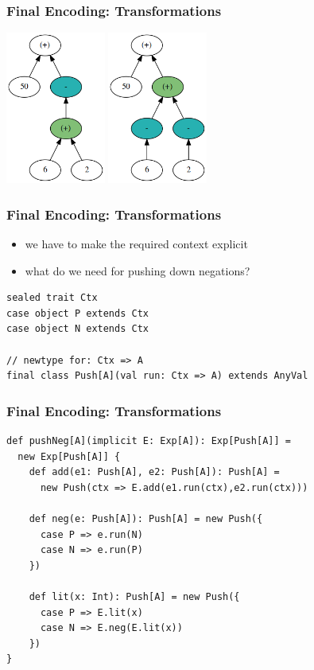 \documentclass{beamer}
\begin{document}
\begin{frame}
  \frametitle{Final Encoding: Transformations}
  \begin{center}
    \includegraphics[height=5cm]{../graphs/ast-from.png}
    \hfill
    \includegraphics[height=5cm]{../graphs/ast-to.png}
  \end{center}
\end{frame}

\begin{frame}
  \frametitle{Final Encoding: Transformations}
  \begin{itemize}
  \item we have to make the required context explicit
  \item what do we need for pushing down negations?
  \end{itemize}
\begin{verbatim}
sealed trait Ctx
case object P extends Ctx
case object N extends Ctx

// newtype for: Ctx => A
final class Push[A](val run: Ctx => A) extends AnyVal
\end{verbatim}
\end{frame}

\begin{frame}[fragile]
  \frametitle{Final Encoding: Transformations}
\begin{verbatim}
def pushNeg[A](implicit E: Exp[A]): Exp[Push[A]] =
  new Exp[Push[A]] {
    def add(e1: Push[A], e2: Push[A]): Push[A] =
      new Push(ctx => E.add(e1.run(ctx),e2.run(ctx)))

    def neg(e: Push[A]): Push[A] = new Push({
      case P => e.run(N)
      case N => e.run(P)
    })

    def lit(x: Int): Push[A] = new Push({
      case P => E.lit(x)
      case N => E.neg(E.lit(x))
    })
}
\end{verbatim}
\end{frame}
\end{document}
